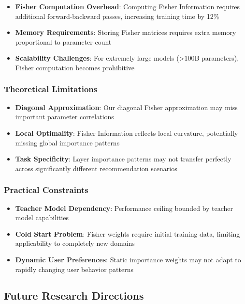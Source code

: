 \documentclass[10pt,conference]{IEEEtran}
\begin{document}
\begin{itemize}[leftmargin=*]
    \item \textbf{Fisher Computation Overhead}: Computing Fisher Information requires additional forward-backward passes, increasing training time by 12\%
    \item \textbf{Memory Requirements}: Storing Fisher matrices requires extra memory proportional to parameter count
    \item \textbf{Scalability Challenges}: For extremely large models (>100B parameters), Fisher computation becomes prohibitive
\end{itemize}

\subsubsection{Theoretical Limitations}

\begin{itemize}[leftmargin=*]
    \item \textbf{Diagonal Approximation}: Our diagonal Fisher approximation may miss important parameter correlations
    \item \textbf{Local Optimality}: Fisher Information reflects local curvature, potentially missing global importance patterns
    \item \textbf{Task Specificity}: Layer importance patterns may not transfer perfectly across significantly different recommendation scenarios
\end{itemize}

\subsubsection{Practical Constraints}

\begin{itemize}[leftmargin=*]
    \item \textbf{Teacher Model Dependency}: Performance ceiling bounded by teacher model capabilities
    \item \textbf{Cold Start Problem}: Fisher weights require initial training data, limiting applicability to completely new domains
    \item \textbf{Dynamic User Preferences}: Static importance weights may not adapt to rapidly changing user behavior patterns
\end{itemize}

\subsection{Future Research Directions}
\end{document}
